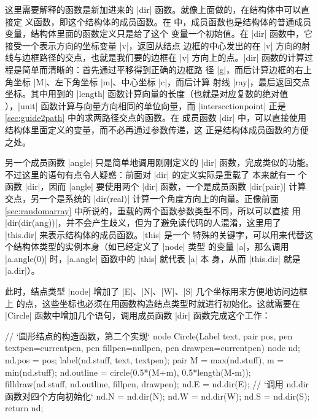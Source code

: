 这里需要解释的函数是新加进来的 |dir| 函数。就像上面做的，在结构体中可以直接定
义函数，即这个结构体的成员函数。在
\Asy{} 中，成员函数也是结构体的普通成员变量，结构体里面的函数定义只是给了这个
变量一个初始值。在 |dir| 函数中，它接受一个表示方向的坐标变量 |v|，返回从结点
边框的中心发出的在 |v| 方向的射线与边框路径的交点，也就是我们要的边框在 |v| 
方向上的点。|dir| 函数的计算过程是简单而清晰的：首先通过平移得到正确的边框路
径 |g|，而后计算边框的右上角坐标 |M|、左下角坐标 |m|、中心坐标 |c|，而后计算
射线 |ray|，最后返回交点坐标。其中用到的 |length|
 函数计算向量的长度（也就是对应复数的绝对值
），|unit| 函数计算与向量方向相同的单位向量，而
|intersectionpoint| 正是 \autoref{sec:guide2path} 中的求两路径交点的函数。在
成员函数 |dir| 中，可以直接使用结构体里面定义的变量，而不必再通过参数传递，这
正是结构体成员函数的方便之处。

另一个成员函数 |angle| 只是简单地调用刚刚定义的 |dir| 函数，完成类似的功能。
不过这里的语句有点令人疑惑：前面对 |dir| 的定义实际是重载了 \Asy{} 本来就有一
个函数 |dir|，因而 |angle| 要使用两个 |dir| 函数，一个是成员函数 |dir(pair)| 
计算交点，另一个是系统的 |dir(real)| 计算一个角度方向上的向量。正像前面
\autoref{sec:randomarray} 中所说的，重载的两个函数参数类型不同，所以可以直接
用 |dir(dir(ang))|，并不会产生歧义，但为了避免读代码的人混淆，这里用了
|this.dir| 来表示结构体的成员函数。|this| 是一个
特殊的关键字，可以用来代替这个结构体类型的实例本身（如已经定义了 |node| 类型
的变量 |a|，那么调用 |a.angle(0)| 时，|a.angle| 函数中的 |this| 就代表 |a| 本
身，从而 |this.dir| 就是 |a.dir|）。

此时，结点类型 |node| 增加了 |E|、|N|、|W|、|S| 几个坐标用来方便地访问边框上
的点，这些坐标也必须在用函数构造结点类型时就进行初始化。这就需要在 |Circle| 
函数中增加几个语句，调用成员函数 |dir| 函数完成这个工作：
\begin{asycode}
// `\color{comment}圆形结点的构造函数，第二个实现`
node Circle(Label text, pair pos, pen textpen=currentpen,
            pen fillpen=nullpen, pen drawpen=currentpen)
{
    node nd;
    nd.pos = pos;
    label(nd.stuff, text, textpen);
    pair M = max(nd.stuff), m = min(nd.stuff);
    nd.outline = circle(0.5*(M+m), 0.5*length(M-m));
    filldraw(nd.stuff, nd.outline, fillpen, drawpen);
    nd.E = nd.dir(E);   // `\color{comment}调用 nd.dir 函数对四个方向初始化`
    nd.N = nd.dir(N);
    nd.W = nd.dir(W);
    nd.S = nd.dir(S);
    return nd;
}
\end{asycode}

